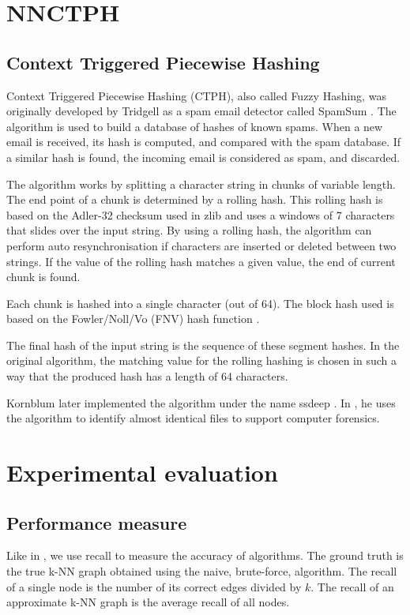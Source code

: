 \documentclass[wcp]{jmlr}
\begin{document}
\section{NNCTPH}

\subsection{Context Triggered Piecewise Hashing}
Context Triggered Piecewise Hashing (CTPH), also called Fuzzy Hashing, was originally developed by Tridgell as a spam email detector called SpamSum \cite{SpamSum}. The algorithm is used to build a database of hashes of known spams. When a new email is received, its hash is computed, and compared with the spam database. If a similar hash is found, the incoming email is considered as spam, and discarded.

The algorithm works by splitting a character string in chunks of variable length. The end point of a chunk is determined by a rolling hash. This rolling hash is based on the Adler-32 checksum used in zlib \cite{zlib} and uses a windows of 7 characters that slides over the input string. By using a rolling hash, the algorithm can perform auto resynchronisation if characters are inserted or deleted between two strings. If the value of the rolling hash matches a given value, the end of current chunk is found.

Each chunk is hashed into a single character (out of 64). The block hash used is based on the Fowler/Noll/Vo (FNV) hash function \cite{FNV}.

The final hash of the input string is the sequence of these segment hashes. In the original algorithm, the matching value for the rolling hashing is chosen in such a way that the produced hash has a length of 64 characters.

Kornblum later implemented the algorithm under the name ssdeep \cite{ssdeep}. In \cite{Kornblum200691}, he uses the algorithm to identify almost identical files to support computer forensics.

\section{Experimental evaluation}

\subsection{Performance measure}

Like in \cite{Dong2011}, we use recall to measure the accuracy of algorithms. The ground truth is the true k-NN graph obtained using the naive, brute-force, algorithm. The recall of a single node is the number of its correct edges divided by $k$. The recall of an approximate k-NN graph is the average recall of all nodes.
\end{document}
